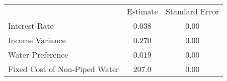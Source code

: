 \begin{tabular}{lcc}
& Estimate & Standard Error \\
Interest Rate &0.038&0.00\\
Income Variance &0.270&0.00\\
Water Preference &0.019&0.00\\
Fixed Cost of Non-Piped Water &207.0&0.00\\
\end{tabular} 
